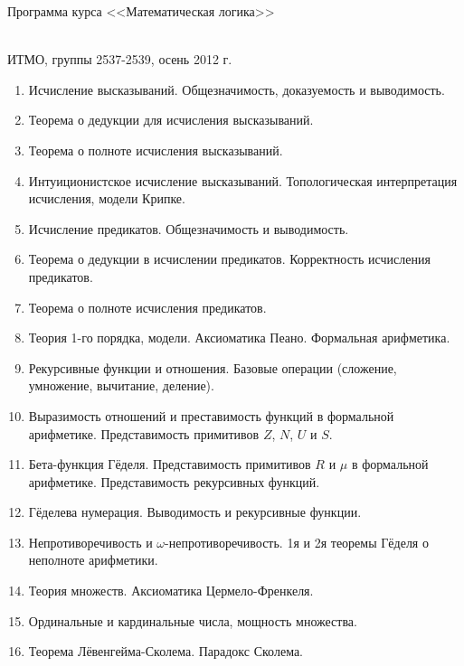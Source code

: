 \documentclass[12pt,a4paper,oneside]{book}
\begin{document}
\begin{center}
\begin{Large}Программа курса <<Математическая логика>>\end{Large}\\
ИТМО, группы 2537-2539, осень 2012 г.
\end{center}

\begin{enumerate}
\item Исчисление высказываний. Общезначимость, доказуемость и выводимость.
\item Теорема о дедукции для исчисления высказываний.
\item Теорема о полноте исчисления высказываний.
\item Интуиционистское исчисление высказываний. Топологическая интерпретация исчисления, модели Крипке.
\item Исчисление предикатов. Общезначимость и выводимость. 
\item Теорема о дедукции в исчислении предикатов. Корректность исчисления предикатов.
\item Теорема о полноте исчисления предикатов.
\item Теория 1-го порядка, модели. Аксиоматика Пеано. Формальная арифметика. 
\item Рекурсивные функции и отношения. Базовые операции (сложение, умножение, 
вычитание, деление).
\item Выразимость отношений и преставимость функций в формальной арифметике.
Представимость примитивов $Z$, $N$, $U$ и $S$.
\item Бета-функция Гёделя. Представимость примитивов $R$ и $\mu$ в формальной арифметике. Представимость
рекурсивных функций.
\item Гёделева нумерация. Выводимость и рекурсивные функции.
\item Непротиворечивость и $\omega$-непротиворечивость. 1я и 2я теоремы 
Гёделя о неполноте арифметики.
\item Теория множеств. Аксиоматика Цермело-Френкеля.
\item Ординальные и кардинальные числа, мощность множества.
\item Теорема Лёвенгейма-Сколема. Парадокс Сколема.
\end{enumerate}
\end{document}
